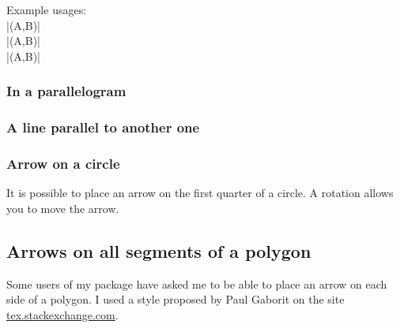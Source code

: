 Example usages: \\

|\tkzDrawSegment[tkz arrow=Stealth] (A,B)|\\
|\tkzDrawSegment[tkz arrow={To[scale=3] at .4}](A,B)|\\
|\tkzDrawSegment[tkz arrow={Latex[scale=5,blue] at .6}](A,B)|

\subsubsection{In a parallelogram}
\begin{tkzexample}[latex=7cm,small]
\end{tkzexample}

\subsubsection{A line parallel to another one}
\begin{tkzexample}[latex=7cm,small]
\end{tkzexample}

\subsubsection{Arrow on a circle}
It is possible to place an arrow on the first quarter of a circle. A rotation allows you to move the arrow.
\begin{tkzexample}[latex=7cm,small]
\end{tkzexample}

\subsection{Arrows on  all segments of a polygon}
Some users of my package have asked me to be able to place an arrow on each side of a polygon. I used a style proposed by Paul Gaborit on the site 
\href{https://tex.stackexchange.com/questions/3161/tikz-how-to-draw-an-arrow-in-the-middle-of-the-line}{tex.stackexchange.com}.


